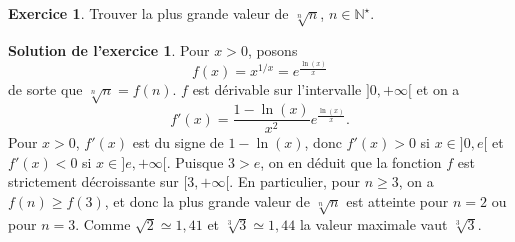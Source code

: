 \documentclass[a4paper, 11pt,openany]{article}%
\theoremstyle{plain}
\theoremstyle{definition}
\newtheorem{exo}{Exercice}
\newtheorem{sol}{Solution de l'exercice}
\theoremstyle{remark}
\newcommand{\N}{\mathbb{N}}
\begin{document}
\begin{exo}
Trouver la plus grande valeur de $\sqrt[n]{n}$, $n \in \N^{\star}$.
\end{exo}

\begin{sol}
Pour $x>0$, posons 
\[ f(x)=x^{ 1/x} = e^{\frac{\ln(x)}{x}}\]
de sorte que $\sqrt[n]{n}=f(n)$. $f$ est dérivable sur l'intervalle $]0,+\infty[$ et on a 
\[ f'(x)=\frac{1-\ln(x)}{x^2}e^{\frac{\ln(x)}{x}}.\]
Pour $x>0$, $f'(x)$ est du signe de $1-\ln(x)$, donc $f'(x)>0$ si $x \in ]0,e[$ et $f'(x)<0$ si $x\in ]e,+\infty[$. Puisque $3>e$, on en déduit que la fonction $f$ est strictement décroissante sur $[3,+\infty[$. En particulier, pour $n \geqslant 3$, on a $f(n) \geqslant f(3)$, et donc la plus grande valeur de $\sqrt[n]{n}$ est atteinte pour $n=2$ ou pour $n=3$. Comme $\sqrt{2} \simeq 1,41$ et $\sqrt[3]{3} \simeq 1,44$ la valeur maximale vaut $\sqrt[3]{3}$.
\end{sol}
\end{document}
